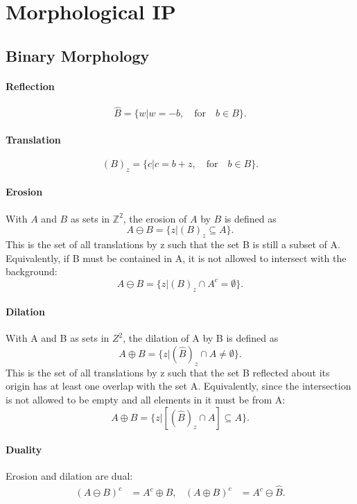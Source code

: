 \section{Morphological IP }

\subsection{Binary Morphology}

\paragraph{Reflection}
\[
	\hat{B} = \{w | w = -b,\quad \text{for} \quad b \in B \}.
\]

\paragraph{Translation}
\[
	(B)_z = \{ c | c = b + z,\quad \text{for} \quad b \in B\}.
\]

\paragraph{Erosion}
With \(A\) and \(B\) as sets in \(\mathbb{Z}^2\), the erosion of \(A\) by \(B\) is defined as
\[
	A \ominus B = \{z|(B)_z \subseteq A  \}.
\]
This is the set of all translations by z such that the set B is still a subset of A.
Equivalently, if B must be contained in A, it is not allowed to intersect with the background:
\[
	A \ominus B = \{z|(B)_z \cap A^c = \emptyset \}.
\]


\paragraph{Dilation}
With A and B as sets in $Z^2$, the dilation of A by B is defined as
\[
	A \oplus B = \{z |(\hat{B})_z \cap A \neq \emptyset \}.
\]
This is the set of all translations by z such that the set B reflected about its origin has at least one overlap with the set A.
Equivalently, since the intersection is not allowed to be empty and all elements in it must be from A:
\[
	A \oplus B = \{z | [(\hat{B})_z \cap A] \subseteq A \}.
\]

\paragraph{Duality}
Erosion and dilation are dual:
\begin{align*}
	(A  \ominus B)^c &= A^c \oplus \hat{B}, &
	(A \oplus B)^c &= A^c \ominus \hat{B}.
\end{align*}

